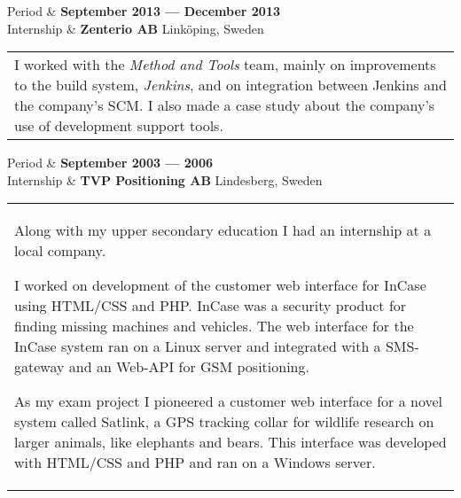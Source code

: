 \documentclass{cv-stylish}
\begin{document}
\begin{center}
\vspace{10pt}

\begin{InfoTable}
 Period & \textbf{September 2013 --- December 2013}\\
 Internship & \textbf{Zenterio AB} \hfill Linköping, Sweden\\
\end{InfoTable}
\begin{tabularx}{0.97\linewidth}{X}
I worked with the \emph{Method and Tools} team, mainly on improvements
to the build system, \emph{Jenkins}, and on integration between Jenkins
and the company's SCM. I also made a case study about the company's
use of development support tools.
\end{tabularx}

\vspace{10pt}

\begin{InfoTable}
 Period & \textbf{September 2003 --- 2006}\\
 Internship & \textbf{TVP Positioning AB} \hfill Lindesberg, Sweden\\
\end{InfoTable}
\begin{tabularx}{0.97\linewidth}{X}
Along with my upper secondary education I had an internship at a local
company.

I worked on development of the customer web interface for InCase using
HTML/CSS and PHP. InCase was a security product for finding missing
machines and vehicles. The web interface for the InCase system ran on
a Linux server and integrated with a SMS-gateway and an Web-API for
GSM positioning.

As my exam project I pioneered a customer web interface for a novel
system called Satlink, a GPS tracking collar for wildlife research on
larger animals, like elephants and bears. This interface was developed
with HTML/CSS and PHP and ran on a Windows server.

\end{tabularx}




\end{center}
\end{document}
